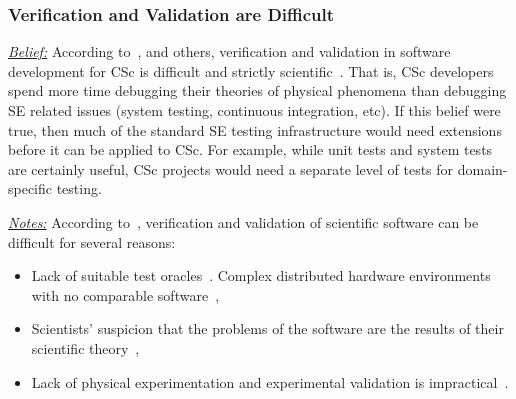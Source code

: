 \documentclass[conference,10pt]{IEEEtran}
\newcommand{\bi}{\begin{itemize}}
\newcommand{\ei}{\end{itemize}}
\newcommand{\fig}[1]{\Cref{fig:#1}}
\newenvironment{RQ}{\vspace{1mm}\begin{tcolorbox}[enhanced,width=3.4in,size=fbox,colback=red!5!white,drop shadow southeast,sharp corners]}{\end{tcolorbox}}
\begin{document}






 


\subsubsection{Verification and Validation are Difficult}\label{vv}
\noindent \textit{\underline{Belief:}} 
According to~\citet{carver07_environment}, and others, 
verification and validation in software development for CSc is difficult and strictly scientific~\cite{kanewala13_testing, carver06_hpc, Prabhu11_cssurvey, basili08_hpc}.
That is, CSc developers spend more time debugging their theories
of physical phenomena than debugging SE related issues (system testing, continuous integration, etc).
If this belief were true, then much of the standard SE testing
infrastructure would need extensions before it can be applied to CSc. For example,
while unit tests and system tests are certainly useful, CSc projects would need a separate level of tests for domain-specific testing. 

\noindent \textit{\underline{Notes:}} 
According to~\citet{carver07_environment},
verification and validation of scientific software can be difficult for several reasons:
\bi
  \item Lack of suitable test oracles~\cite{kanewala13_testing}. Complex distributed hardware environments with no comparable software~\cite{basili08_hpc},
  \item Scientists' suspicion that the problems of the software are the results of their scientific theory~\cite{faulk09_secs},
  \item Lack of physical experimentation and experimental validation is impractical~\cite{carver07_environment}. 
\ei
\end{document}

